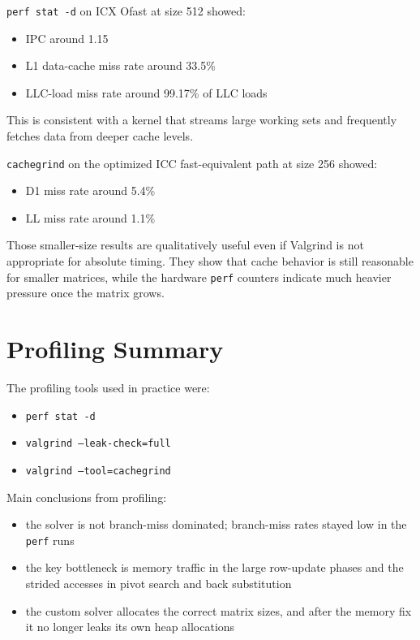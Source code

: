 \documentclass[11pt,a4paper]{article}
\begin{document}
\texttt{perf stat -d} on ICX Ofast at size 512 showed:

\begin{itemize}
\item IPC around 1.15
\item L1 data-cache miss rate around 33.5\%
\item LLC-load miss rate around 99.17\% of LLC loads
\end{itemize}

This is consistent with a kernel that streams large working sets and frequently
fetches data from deeper cache levels.

\texttt{cachegrind} on the optimized ICC fast-equivalent path at size 256 showed:

\begin{itemize}
\item D1 miss rate around 5.4\%
\item LL miss rate around 1.1\%
\end{itemize}

Those smaller-size results are qualitatively useful even if Valgrind is not
appropriate for absolute timing. They show that cache behavior is still
reasonable for smaller matrices, while the hardware \texttt{perf} counters
indicate much heavier pressure once the matrix grows.

\section{Profiling Summary}

The profiling tools used in practice were:

\begin{itemize}
\item \texttt{perf stat -d}
\item \texttt{valgrind --leak-check=full}
\item \texttt{valgrind --tool=cachegrind}
\end{itemize}

Main conclusions from profiling:

\begin{itemize}
\item the solver is not branch-miss dominated; branch-miss rates stayed low in the \texttt{perf} runs
\item the key bottleneck is memory traffic in the large row-update phases and the strided accesses in pivot search and back substitution
\item the custom solver allocates the correct matrix sizes, and after the memory fix it no longer leaks its own heap allocations
\end{itemize}
\end{document}
